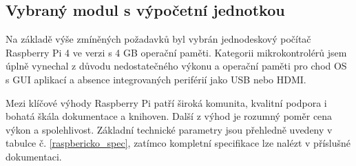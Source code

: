 \subsection{Vybraný modul s výpočetní jednotkou}
Na základě výše zmíněných požadavků byl vybrán jednodeskový počítač Raspberry Pi 4 ve verzi s 4 GB operační paměti. Kategorii mikrokontrolérů jsem úplně vynechal z důvodu nedostatečného výkonu a operační paměti pro chod OS s GUI aplikací a absence integrovaných periférií jako USB nebo HDMI. 

Mezi klíčové výhody Raspberry Pi patří široká komunita, kvalitní podpora i bohatá škála dokumentace a knihoven. Další z výhod je rozumný poměr cena výkon a spolehlivost. Základní technické parametry jsou přehledně uvedeny v tabulce č. \ref{raspbericko_spec}, zatímco kompletní specifikace lze nalézt v příslušné dokumentaci. \cite{Raspberry pi}



